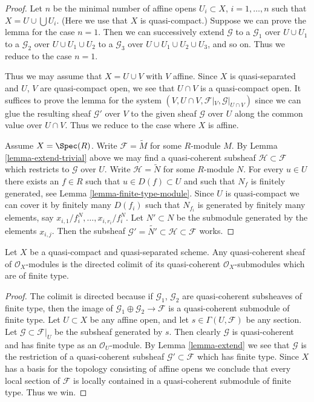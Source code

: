 \begin{proof}
Let $n$ be the minimal number of affine opens $U_i \subset X$,
$i = 1, \ldots , n$ such that $X = U \cup \bigcup U_i$.
(Here we use that $X$ is quasi-compact.) Suppose
we can prove the lemma for the case $n = 1$. Then we can successively
extend $\mathcal{G}$
to a $\mathcal{G}_1$ over $U \cup U_1$
to a $\mathcal{G}_2$ over $U \cup U_1 \cup U_2$
to a $\mathcal{G}_3$ over $U \cup U_1 \cup U_2 \cup U_3$,
and so on.
Thus we reduce to the case $n = 1$.

\medskip\noindent
Thus we may assume that $X = U \cup V$ with $V$ affine.
Since $X$ is quasi-separated and $U$, $V$ are quasi-compact open,
we see that $U \cap V$ is a quasi-compact open. It suffices to prove the
lemma for the system $(V, U \cap V, \mathcal{F}|_V, \mathcal{G}|_{U \cap V})$
since we can glue the resulting sheaf $\mathcal{G}'$ over $V$
to the given sheaf $\mathcal{G}$ over $U$ along the common value
over $U \cap V$.
Thus we reduce to the case where $X$ is affine.

\medskip\noindent
Assume $X = \Spec(R)$. Write $\mathcal{F} = \widetilde M$
for some $R$-module $M$. By Lemma \ref{lemma-extend-trivial} above we may
find a quasi-coherent subsheaf $\mathcal{H} \subset \mathcal{F}$
which restricts to $\mathcal{G}$ over $U$.
Write $\mathcal{H} = \widetilde N$ for some $R$-module $N$.
For every $u \in U$ there exists an $f \in R$ such that
$u \in D(f) \subset U$ and such that $N_f$ is finitely generated,
see Lemma \ref{lemma-finite-type-module}.
Since $U$ is quasi-compact we can cover it by finitely
many $D(f_i)$ such that $N_{f_i}$ is generated by
finitely many elements, say $x_{i, 1}/f_i^N, \ldots, x_{i, r_i}/f_i^N$.
Let $N' \subset N$ be the submodule generated by the elements
$x_{i, j}$. Then the subsheaf
$\mathcal{G}' = \widetilde{N'} \subset \mathcal{H} \subset \mathcal{F}$
works.
\end{proof}

\begin{lemma}
\label{lemma-quasi-coherent-colimit-finite-type}
Let $X$ be a quasi-compact and quasi-separated scheme.
Any quasi-coherent sheaf of $\mathcal{O}_X$-modules
is the directed colimit of its quasi-coherent
$\mathcal{O}_X$-submodules which are of finite type.
\end{lemma}

\begin{proof}
The colimit is directed because if $\mathcal{G}_1$, $\mathcal{G}_2$
are quasi-coherent subsheaves of finite type, then the image of
$\mathcal{G}_1 \oplus \mathcal{G}_2 \to \mathcal{F}$ is
a quasi-coherent submodule of finite type.
Let $U \subset X$ be any affine open, and let
$s \in \Gamma(U, \mathcal{F})$ be any section.
Let $\mathcal{G} \subset \mathcal{F}|_U$ be the
subsheaf generated by $s$. Then clearly $\mathcal{G}$
is quasi-coherent and has finite type as an $\mathcal{O}_U$-module.
By Lemma \ref{lemma-extend} we see that $\mathcal{G}$ is the restriction
of a quasi-coherent subsheaf $\mathcal{G}' \subset \mathcal{F}$
which has finite type. Since $X$ has a basis for the topology consisting
of affine opens we conclude that every local section of
$\mathcal{F}$ is locally contained in a quasi-coherent submodule
of finite type. Thus we win.
\end{proof}

